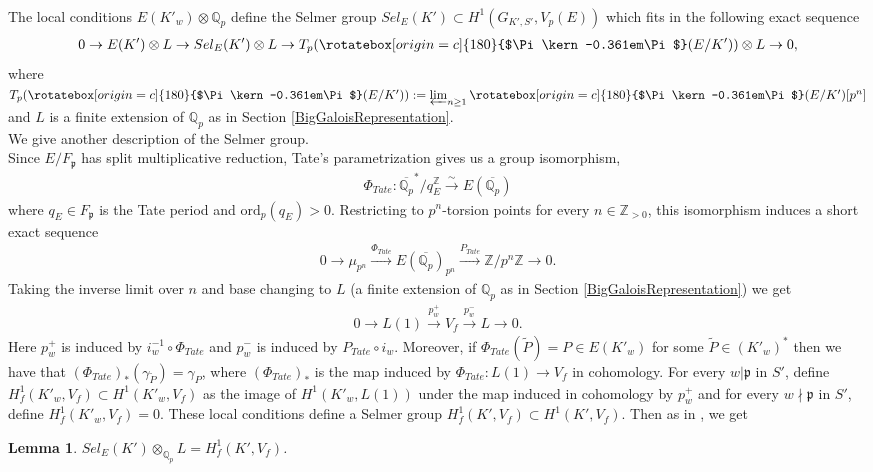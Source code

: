 \documentclass[reqno,10pt]{amsart}
\newcommand{\qp}{\mathbb{Q}_{p}}
\newcommand{\z}{\mathbb{Z}}
\newcommand{\Varpi}{\rotatebox[origin=c]{180}{$\Pi\kern-0.361em\Pi$}}
\theoremstyle{plain}
\newtheorem{lem}[thm]{Lemma}
\theoremstyle{definition}
\begin{document}
\\
The local conditions $E(K'_w) \otimes \qp$ define the Selmer group $Sel_E(K') \subset H^1(G_{K',S'},V_p(E))$ which fits in the following exact sequence
\begin{align} \label{ses for MW group}
    0 \rightarrow E(K') \otimes L \rightarrow Sel_E(K') \otimes L \rightarrow T_p(\Varpi(E/K')) \otimes L \rightarrow 0,
\end{align}
where $T_p(\Varpi(E/K')) := \varprojlim_{n \geq 1} \Varpi(E/K')[p^n]$ and $L$ is a finite extension of $\qp$ as in Section \ref{BigGaloisRepresentation}.
\\
We give another description of the Selmer group.
\\
Since $E/F_\mathfrak{p}$ has split multiplicative reduction, Tate's parametrization gives us a group isomorphism,
\begin{align*}
    \Phi_{Tate} : \overline{\qp}^*/q_E^\z \xrightarrow{\sim} E(\overline{\qp})
 \end{align*}
where $q_E \in F_\mathfrak{p}$ is the Tate period and $\mathrm{ord}_p(q_E)>0$. Restricting to $p^n$-torsion points for every $n \in \z_{>0}$, this isomorphism induces a short exact sequence
\begin{align*} 
    0 \rightarrow \mu_{p^n} \xrightarrow{\Phi_{Tate}} E(\overline{\qp})_{p^n} \xrightarrow{P_{Tate}} \z/p^n\z \rightarrow 0.
\end{align*}
Taking the inverse limit over $n$ and base changing to $L$ (a finite extension of $\qp$ as in Section \ref{BigGaloisRepresentation}) we get
\begin{align} \label{ses for Vf}
    0 \rightarrow L(1) \xrightarrow{p_w^+} V_f \xrightarrow{p_w^-} L \rightarrow 0.
\end{align}
Here $p_w^+$ is induced by $i_w^{-1} \circ \Phi_{Tate}$ and $p_w^-$ is induced by $P_{Tate} \circ i_w$. Moreover, if $\Phi_{Tate}(\widetilde{P}) = P \in E(K'_w)$ for some $\widetilde{P} \in (K'_w)^*$ then we have that $(\Phi_{Tate})_*(\gamma_{\widetilde{P}}) = \gamma_P$, where $(\Phi_{Tate})_*$ is the map induced by $\Phi_{Tate} : L(1) \rightarrow V_f$ in cohomology. For every $w|\mathfrak{p}$ in $S'$, define $H^1_f(K'_w,V_f) \subset H^1(K'_w,V_f)$ as the image of $H^1(K'_w,L(1))$ under the map induced in cohomology by $p_w^+$ and for every $w \nmid \mathfrak{p}$ in $S'$, define $H^1_f(K'_w,V_f)=0$. These local conditions define a Selmer group $H^1_f(K',V_f) \subset H^1(K',V_f)$. Then as in \cite[Section 2]{greenberg1998iwasawatheoryellipticcurves}, we get
\begin{lem}
    $Sel_E(K') \otimes_{\qp} L = H^1_f(K',V_f)$.
\end{lem}
\end{document}
